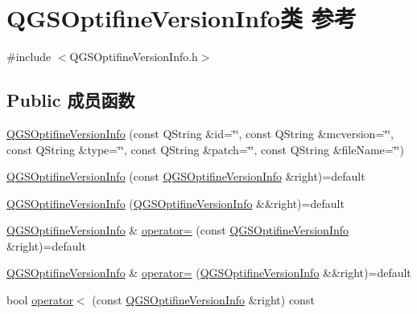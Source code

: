 \hypertarget{class_q_g_s_optifine_version_info}{}\section{Q\+G\+S\+Optifine\+Version\+Info类 参考}
\label{class_q_g_s_optifine_version_info}


{\ttfamily \#include $<$Q\+G\+S\+Optifine\+Version\+Info.\+h$>$}

\subsection*{Public 成员函数}
\begin{DoxyCompactItemize}
\item 
\mbox{\hyperlink{class_q_g_s_optifine_version_info_abfcd16276379841e8e1e529ff4a002c1}{Q\+G\+S\+Optifine\+Version\+Info}} (const Q\+String \&id=\char`\"{}\char`\"{}, const Q\+String \&mcversion=\char`\"{}\char`\"{}, const Q\+String \&type=\char`\"{}\char`\"{}, const Q\+String \&patch=\char`\"{}\char`\"{}, const Q\+String \&file\+Name=\char`\"{}\char`\"{})
\item 
\mbox{\hyperlink{class_q_g_s_optifine_version_info_a83060ac42b5caf8d1745e2087c393e41}{Q\+G\+S\+Optifine\+Version\+Info}} (const \mbox{\hyperlink{class_q_g_s_optifine_version_info}{Q\+G\+S\+Optifine\+Version\+Info}} \&right)=default
\item 
\mbox{\hyperlink{class_q_g_s_optifine_version_info_a1390a64466b947b43399877450fc6ce1}{Q\+G\+S\+Optifine\+Version\+Info}} (\mbox{\hyperlink{class_q_g_s_optifine_version_info}{Q\+G\+S\+Optifine\+Version\+Info}} \&\&right)=default
\item 
\mbox{\hyperlink{class_q_g_s_optifine_version_info}{Q\+G\+S\+Optifine\+Version\+Info}} \& \mbox{\hyperlink{class_q_g_s_optifine_version_info_a760d9b26e37489878634aa588fd91343}{operator=}} (const \mbox{\hyperlink{class_q_g_s_optifine_version_info}{Q\+G\+S\+Optifine\+Version\+Info}} \&right)=default
\item 
\mbox{\hyperlink{class_q_g_s_optifine_version_info}{Q\+G\+S\+Optifine\+Version\+Info}} \& \mbox{\hyperlink{class_q_g_s_optifine_version_info_a1d7fb8a19b87bc2275a19e9f03560a95}{operator=}} (\mbox{\hyperlink{class_q_g_s_optifine_version_info}{Q\+G\+S\+Optifine\+Version\+Info}} \&\&right)=default
\item 
bool \mbox{\hyperlink{class_q_g_s_optifine_version_info_a6309e757158d958196001474f480a7bc}{operator$<$}} (const \mbox{\hyperlink{class_q_g_s_optifine_version_info}{Q\+G\+S\+Optifine\+Version\+Info}} \&right) const

\end{DoxyCompactItemize}
